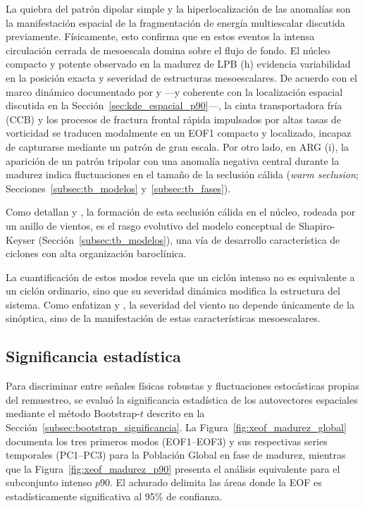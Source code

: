 La quiebra del patrón dipolar simple y la hiperlocalización de las anomalías son la manifestación espacial de la fragmentación de energía multiescalar discutida previamente.
Físicamente, esto confirma que en estos eventos la intensa circulación cerrada de mesoescala domina sobre el flujo de fondo. 
El núcleo compacto y potente observado en la madurez de LPB (h) evidencia variabilidad en la posición exacta y severidad de estructuras mesoescalares. 
De acuerdo con el marco dinámico documentado por \citet{clark2005sting} y \citet{han2025system} ---y coherente con la localización espacial discutida en la Sección~\ref{sec:kde_espacial_p90}---, la cinta transportadora fría (CCB) y los procesos de fractura frontal rápida impulsados por altas tasas de vorticidad se traducen modalmente en un EOF1 compacto y localizado, incapaz de capturarse mediante un patrón de gran escala. 
Por otro lado, en ARG (i), la aparición de un patrón tripolar con una anomalía negativa central durante la madurez indica fluctuaciones en el tamaño de la seclusión cálida (\textit{warm seclusion}; Secciones~\ref{subsec:tb_modelos} y~\ref{subsec:tb_fases}).



Como detallan \citet{schultz2021antecedents} y \citet{reboita2022from}, la formación de esta seclusión cálida en el núcleo, rodeada por un anillo de vientos, es el rasgo evolutivo del modelo conceptual de Shapiro-Keyser (Sección~\ref{subsec:tb_modelos}), una vía de desarrollo característica de ciclones con alta organización baroclínica.

La cuantificación de estos modos revela que un ciclón intenso no es equivalente a un ciclón ordinario, sino que su severidad dinámica modifica la estructura del sistema. 
Como enfatizan \citet{corner2025classification} y \citet{eisenstein2023identification}, la severidad del viento no depende únicamente de la sinóptica, sino de la manifestación de estas características mesoescalares. 


\subsection{Significancia estadística}\label{subsec:res_significancia_madurez}

Para discriminar entre señales físicas robustas y fluctuaciones estocásticas propias del remuestreo, se evaluó la significancia estadística de los autovectores espaciales mediante el método Bootstrap-$t$ descrito en la Sección~\ref{subsec:bootstrap_significancia}. 
La Figura~\ref{fig:xeof_madurez_global} documenta los tres primeros modos (EOF1--EOF3) y sus respectivas series temporales (PC1--PC3) para la Población Global en fase de madurez, mientras que la Figura~\ref{fig:xeof_madurez_p90} presenta el análisis equivalente para el subconjunto intenso $p90$.
El achurado delimita las áreas donde la EOF es estadísticamente significativa al 95\% de confianza.

